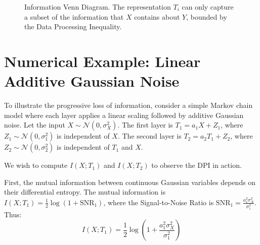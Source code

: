 \begin{figure}[ht]
\centering
{}
\caption{Information Venn Diagram. The representation $T_i$ can only capture a subset of the information that $X$ contains about $Y$, bounded by the Data Processing Inequality.}
\label{fig:venn_dpi}
\end{figure}

\section{Numerical Example: Linear Additive Gaussian Noise}
To illustrate the progressive loss of information, consider a simple Markov chain model where each layer applies a linear scaling followed by additive Gaussian noise. Let the input $X \sim \mathcal{N}(0, \sigma_X^2)$.
The first layer is $T_1 = a_1 X + Z_1$, where $Z_1 \sim \mathcal{N}(0, \sigma_1^2)$ is independent of $X$.
The second layer is $T_2 = a_2 T_1 + Z_2$, where $Z_2 \sim \mathcal{N}(0, \sigma_2^2)$ is independent of $T_1$ and $X$.

We wish to compute $I(X; T_1)$ and $I(X; T_2)$ to observe the DPI in action.

First, the mutual information between continuous Gaussian variables depends on their differential entropy. The mutual information is $I(X; T_1) = \frac{1}{2} \log(1 + \text{SNR}_1)$, where the Signal-to-Noise Ratio is $\text{SNR}_1 = \frac{a_1^2 \sigma_X^2}{\sigma_1^2}$. Thus:
\[ I(X; T_1) = \frac{1}{2} \log\left( 1 + \frac{a_1^2 \sigma_X^2}{\sigma_1^2} \right) \]

